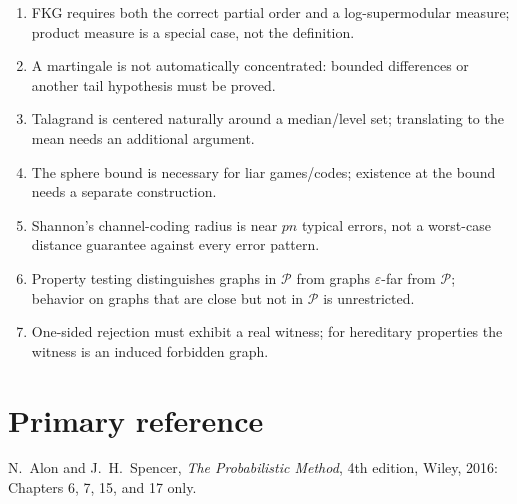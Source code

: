 \documentclass[10pt]{article}
\newcommand{\1}{\mathbf 1}
\begin{document}
\begin{enumerate}
\item FKG requires both the correct partial order and a log-supermodular
measure; product measure is a special case, not the definition.
\item A martingale is not automatically concentrated: bounded differences or
another tail hypothesis must be proved.
\item Talagrand is centered naturally around a median/level set; translating to
the mean needs an additional argument.
\item The sphere bound is necessary for liar games/codes; existence at the
bound needs a separate construction.
\item Shannon's channel-coding radius is near $pn$ typical errors, not a
worst-case distance guarantee against every error pattern.
\item Property testing distinguishes graphs in $\mathcal P$ from graphs
$\varepsilon$-far from $\mathcal P$; behavior on graphs that are close but not
in $\mathcal P$ is unrestricted.
\item One-sided rejection must exhibit a real witness; for hereditary
properties the witness is an induced forbidden graph.
\end{enumerate}

\section*{Primary reference}
N.~Alon and J.~H.~Spencer, \emph{The Probabilistic Method}, 4th edition,
Wiley, 2016: Chapters 6, 7, 15, and 17 only.
\end{document}
